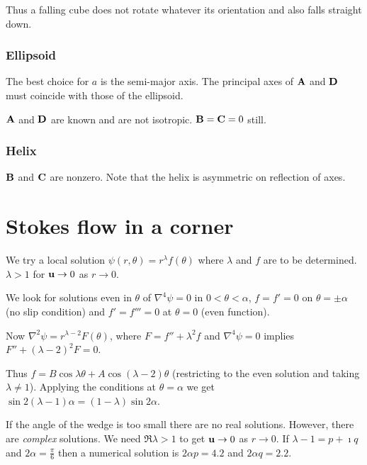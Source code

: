 \documentclass{notes}
\theoremstyle{plain}
\begin{document}
Thus a falling cube does not rotate whatever its orientation and also falls
straight down.

\subsubsection*{Ellipsoid}

The best choice for $a$ is the semi-major axis.  The principal axes
of $\mathbf{A}$ and $\mathbf{D}$ must coincide with those of the ellipsoid.

$\mathbf{A}$ and $\mathbf{D}$ are known and are not isotropic.  $\mathbf{B}
= \mathbf{C} = 0$ still.

\subsubsection*{Helix}

$\mathbf{B}$ and $\mathbf{C}$ are nonzero.  Note that the helix is
asymmetric on reflection of axes.

\section{Stokes flow in a corner}

\vspace{1in}

We try a local solution $\psi(r,\theta) = r^\lambda f(\theta)$
where $\lambda$ and $f$ are to be determined.  $\lambda > 1$ for
$\mathbf{u} \to 0$ as $r \to 0$.

We look for solutions even in $\theta$ of
$\nabla^4 \psi = 0$ in $0 < \theta <\alpha$, $f = f' = 0$ on
$\theta = \pm \alpha$ (no slip condition) and $f' = f''' = 0$ at $\theta =0$
(even function).

Now $\nabla^2 \psi = r^{\lambda - 2} F(\theta)$, where $F = f'' + \lambda^2 f$
and $\nabla^4 \psi = 0$ implies $F'' + \left( \lambda - 2\right)^2 F = 0$.

Thus $f = B \cos \lambda \theta + A \cos \left( \lambda - 2\right) \theta$
(restricting to the even solution and taking
$\lambda \neq 1$).  Applying the conditions at
$\theta = \alpha$ we get
$ \sin 2 \left(\lambda - 1\right) \alpha = \left( 1- \lambda \right)
\sin 2 \alpha$.

\vspace{1in}

If the angle of the wedge is too small there are no real solutions.  However,
there are \emph{complex} solutions.  We need $\Re \lambda > 1$ to get
$\mathbf{u} \to 0$ as $r \to 0$.  If $\lambda - 1 = p + \imath q$ and
$2 \alpha = \frac{\pi}{6}$ then a numerical solution is
$2 \alpha p = 4.2$ and $2 \alpha q = 2.2$.
\end{document}
